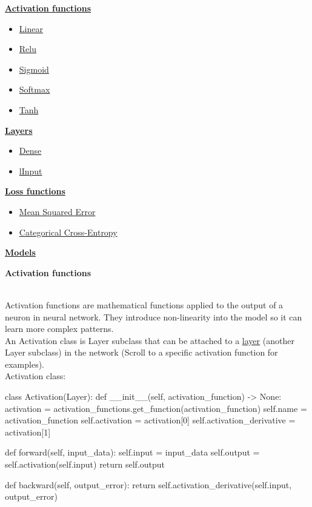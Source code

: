 \documentclass{article}
\begin{document}
    \hyperlink{activation_functions}{\textbf{Activation functions}}
    \begin{itemize}
        \item \hyperlink{linear}{Linear}
        \item \hyperlink{relu}{Relu}
        \item \hyperlink{sigmoid}{Sigmoid}
        \item \hyperlink{softmax}{Softmax}
        \item \hyperlink{tanh}{Tanh}
    \end{itemize}

    \hyperlink{layers}{\textbf{Layers}}
    \begin{itemize}
        \item \hyperlink{dense_layer}{Dense}
        \item \hyperlink{input_layer}{lInput}
    \end{itemize}
    \hyperlink{losses}{\textbf{Loss functions}}
    \begin{itemize}
        \item \hyperlink{mse}{Mean Squared Error}
        \item \hyperlink{cce}{Categorical Cross-Entropy}
    \end{itemize}
    \hyperlink{models}{\textbf{Models}} \\
    \clearpage

    \hypertarget{activation_functions}{\textbf{Activation functions}} \\

    Activation functions are mathematical functions applied to
    the output of a neuron in neural network. They introduce non-linearity into 
    the model so it can learn more complex patterns. \\

    An Activation class is Layer subclass that can be attached to a \hyperlink{layers}{\underline{layer}} 
    (another Layer subclass) in the network (Scroll to a specific activation function for examples). \\

    Activation class:
    \begin{python}
class Activation(Layer):
    def __init__(self, activation_function) -> None:
        activation = activation_functions.get_function(activation_function)
        self.name = activation_function
        self.activation = activation[0]
        self.activation_derivative = activation[1]

    def forward(self, input_data):
        self.input = input_data
        self.output = self.activation(self.input)
        return self.output

    def backward(self, output_error):
        return self.activation_derivative(self.input, output_error)
    \end{python}
    \pagebreak
\end{document}

